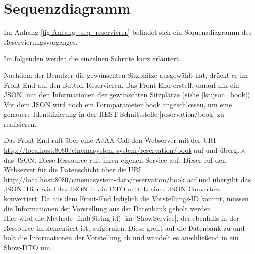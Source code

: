 \section{Sequenzdiagramm}
\label{sec:sequenzdiagram}
\authorsection{\authorSG}

Im Anhang \vref{fig:Anhang_seq_reservieren} befindet sich ein Sequenzdiagramm des Reservierungsvorganges.

Im folgenden werden die einzelnen Schritte kurz erläutert. 

Nachdem der Benutzer die gewünschten Sitzplätze ausgewählt hat, drückt er im Front-End auf den Button Reservieren. 
Das Front-End erstellt darauf hin ein \acs{JSON}, mit den Informationen der gewünschten Sitzplätze (siehe  \vref{lst:json_book}). 
Vor dem \acs{JSON} wird noch ein Formparameter book angeschlossen, um eine genauere Identifizierung in der \acs{REST}-Schnittstelle \jinline|reservation/book| zu realisieren. 

Das Front-End ruft über eine \acs{AJAX}-Call den Webserver mit der \acs{URI}  \url{http://localhost:8080/cinemasystem-system/reservation/book} auf und übergibt das \acs{JSON}. 
Diese Ressource ruft ihren eigenen Service auf. 
Dieser ruf den Webserver für die Datenschicht über die \acs{URI} \url{http://localhost:8080/cinemasystem-data/reservation/book} auf und übergibt das \acs{JSON}. 
Hier wird das \acs{JSON} in ein \acs{DTO} mittels eines \acs{JSON}-Converters konvertiert.
Da aus dem Front-End lediglich die  Vorstellungs-ID kommt, müssen die Informationen der Vorstellung aus der Datenbank geholt werden. \\
Hier wird die Methode \jinline|find(String id)| im \jinline|ShowService|, der ebenfalls in der Ressource implementiert ist, aufgerufen. 
Diese greift auf die Datenbank zu und holt die Informationen der Vorstellung ab und wandelt es anschließend in ein Show-\acs{DTO} um. 



